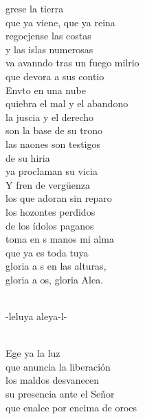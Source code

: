 \documentclass[12pt]{article}
\begin{document}
\begin{multicols*}{2}
\begin{cancion}%
	grese la tierra  \\
que ya viene, que ya reina\\
	regocjense las costas \\
y las islas numerosas\\
	va avanndo tras un fuego milrio\\
	que devora a sus contio\\
	Envto en una nube \\
quiebra el mal y el abandono\\
	la juscia y el derecho \\
son la base de su trono\\
	las naones son testigos \\
	de su hiria\\
	ya proclaman su vicia\\
	Y fren de vergüenza \\
los que adoran sin reparo\\
	los hozontes perdidos \\
de los ídolos paganos\\
	toma en s manos mi alma \\
	que ya es toda tuya\\
	gloria a s en las alturas, \\
	gloria a os, gloria Alea.\\\jump\\
	\begin{chorus}%
	-leluya aleya-l-\\
	\end{chorus}%
	\jump\\
	Ege ya la luz \\
que anuncia la liberación\\
	los maldos desvanecen \\
su presencia ante el Señor\\
	que enalce por encima de oroes\\

\end{cancion}
\end{multicols*}
\end{document}

